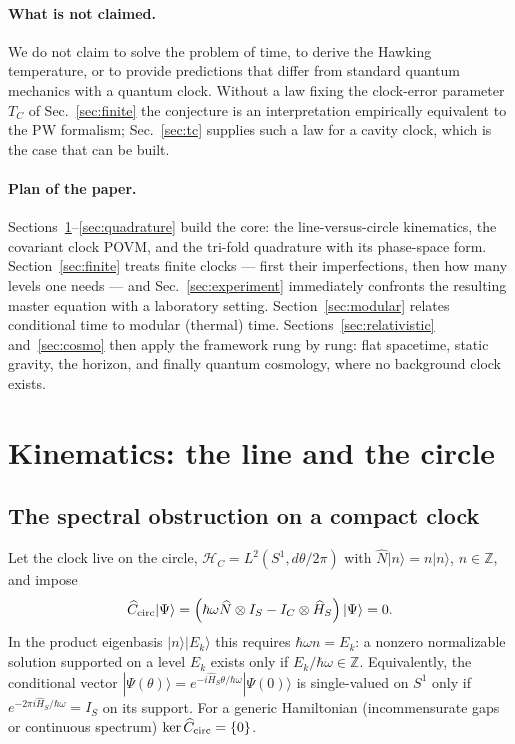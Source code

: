 \documentclass[aps,prd,onecolumn,notitlepage,10pt,amsmath,amssymb,amsfonts,nofootinbib]{revtex4-2}
\theoremstyle{definition}
\theoremstyle{remark}
\newcommand{\Hil}{\mathcal{H}}
\newcommand{\Hs}{\widehat{H}_S}
\newcommand{\Nop}{\widehat{N}}
\newcommand{\Cop}{\widehat{C}}
\newcommand{\Z}{\mathbb{Z}}
\begin{document}
\paragraph*{What is not claimed.}
We do not claim to solve the problem of time, to derive the Hawking temperature, or to provide predictions that differ from standard quantum mechanics with a quantum clock. Without a law fixing the clock-error parameter $T_C$ of Sec.~\ref{sec:finite} the conjecture is an interpretation empirically equivalent to the PW formalism; Sec.~\ref{sec:tc} supplies such a law for a cavity clock, which is the case that can be built.

\paragraph*{Plan of the paper.}
Sections~\ref{sec:kinematics}--\ref{sec:quadrature} build the core: the line-versus-circle kinematics, the covariant clock POVM, and the tri-fold quadrature with its phase-space form. Section~\ref{sec:finite} treats finite clocks --- first their imperfections, then how many levels one needs --- and Sec.~\ref{sec:experiment} immediately confronts the resulting master equation with a laboratory setting. Section~\ref{sec:modular} relates conditional time to modular (thermal) time. Sections~\ref{sec:relativistic} and~\ref{sec:cosmo} then apply the framework rung by rung: flat spacetime, static gravity, the horizon, and finally quantum cosmology, where no background clock exists.

\section{Kinematics: the line and the circle}
\label{sec:kinematics}

\subsection{The spectral obstruction on a compact clock}
Let the clock live on the circle, $\Hil_C=L^2(S^1,d\theta/2\pi)$ with $\Nop|n\rangle=n|n\rangle$, $n\in\Z$, and impose
\begin{equation}
  \Cop_{\rm circ}|\Psi\rangle=\left(\hbar\omega\Nop\otimes I_S-I_C\otimes\Hs\right)|\Psi\rangle=0 .
  \label{eq:circ_constraint}
\end{equation}
In the product eigenbasis $|n\rangle|E_k\rangle$ this requires $\hbar\omega n=E_k$: a nonzero normalizable solution supported on a level $E_k$ exists only if $E_k/\hbar\omega\in\Z$. Equivalently, the conditional vector $|\Psi(\theta)\rangle=e^{-i\Hs\theta/\hbar\omega}|\Psi(0)\rangle$ is single-valued on $S^1$ only if $e^{-2\pi i\Hs/\hbar\omega}=I_S$ on its support. For a generic Hamiltonian (incommensurate gaps or continuous spectrum) $\ker\Cop_{\rm circ}=\{0\}$.
\end{document}
